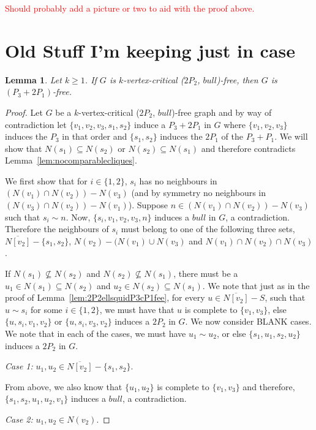 \documentclass[11pt]{article}
\newtheorem{lemma}[theorem]{Lemma}
\theoremstyle{definition}
\begin{document}
\textcolor{red}{Should probably add a picture or two to aid with the proof above.}

\section{Old Stuff I'm keeping just in case}



\begin{lemma}\label{lem:2P2bullP32P1fee}
Let $k\ge 1$. If $G$ is $k$-vertex-critical ($2P_2$, $bull$)-free, then $G$ is $(P_3+2 P_1)$-free.
\end{lemma}
\begin{proof}
Let $G$ be a $k$-vertex-critical ($2P_2$, $bull$)-free graph and by way of contradiction let $\{v_1,v_2,v_3,s_1,s_2\}$ induce a $P_3+2P_1$ in $G$ where $\{v_1,v_2,v_3\}$ induces the $P_3$ in that order and $\{s_1,s_2\}$ induces the $2P_1$ of the $P_3+P_1$. We will show that $N(s_1)\subseteq N(s_2)$ or $N(s_2)\subseteq N(s_1)$ and therefore contradicts Lemma~\ref{lem:nocomparablecliques}.

We first show that for $i\in\{1,2\}$, $s_i$ has no neighbours in $(N(v_1)\cap N(v_2))-N(v_3)$  (and by symmetry no neighbours in $(N(v_3)\cap N(v_2))-N(v_1)$). Suppose $n\in (N(v_1)\cap N(v_2))-N(v_3)$ such that $s_i\sim n$. Now, $\{s_i,v_1,v_2,v_3,n\}$ induces a $bull$ in $G$, a contradiction. Therefore the neighbours of $s_i$ must belong to one of the following three sets, $\overline{N[v_2]}-\{s_1,s_2\}$, $N(v_2)-(N(v_1)\cup N(v_3)$ and $N(v_1)\cap N(v_2)\cap N(v_3)$. 

If $N(s_1)\not\subseteq N(s_2)$ and $N(s_2)\not\subseteq N(s_1)$, there must be a $u_1\in N(s_1)\subseteq N(s_2)$ and $u_2\in N(s_2)\subseteq N(s_1)$. We note that just as in the proof of Lemma~\ref{lem:2P2ellsquidP3cP1fee}, for every $u\in \overline{N[v_2]}-S$, such that $u\sim s_i$ for some $i\in \{1,2\}$, we must have that $u$ is complete to $\{v_1,v_3\}$, else $\{u,s_i,v_1,v_2\}$ or $\{u,s_i,v_3,v_2\}$ induces a $2P_2$ in $G$. We now consider BLANK cases. We note that in each of the cases, we must have $u_1\sim u_2$, or else $\{s_1,u_1,s_2,u_2\}$ induces a $2P_2$ in $G$.

\noindent \textit{Case 1:} $u_1,u_2\in \overline{N[v_2]}-\{s_1,s_2\}$.

From above, we also know that $\{u_1,u_2\}$ is complete to $\{v_1,v_3\}$ and therefore, $\{s_1,s_2,u_1,u_2,v_1\}$ induces a $bull$, a contradiction.

\noindent \textit{Case 2:} $u_1,u_2\in N(v_2)$.


\end{proof}
\end{document}
